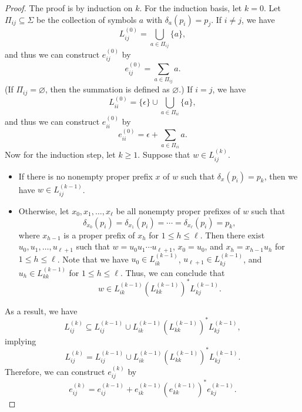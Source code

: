 \begin{proof}
  The proof is by induction on $k$. For the induction basis, let $k = 0$.
  Let $\Pi_{ij} \subseteq \Sigma$ be the collection of symbols $a$ with
  $\delta_a(p_i) = p_j$.
  If $i \neq j$, we have
  \begin{equation*}
    L_{ij}^{(0)} = \bigcup_{a \in \Pi_{ij}} \{a\},
  \end{equation*}
  and thus we can construct $e_{ij}^{(0)}$ by
  \begin{equation*}
    e_{ij}^{(0)} = \sum_{a \in \Pi_{ij}} a.
  \end{equation*}
  (If $\Pi_{ij} = \varnothing$, then the summation is defined as
  $\varnothing$.)
  If $i = j$, we have
  \begin{equation*}
    L_{ii}^{(0)} = \{\epsilon\} \cup \bigcup_{a \in \Pi_{ii}} \{a\},
  \end{equation*}
  and thus we can construct $e_{ii}^{(0)}$ by
  \begin{equation*}
    e_{ii}^{(0)} = \epsilon + \sum_{a \in \Pi_{ii}} a.
  \end{equation*}
  Now for the induction step, let $k \geq 1$.
  Suppose that $w \in L_{ij}^{(k)}$.
  \begin{itemize}
    \item If there is no nonempty proper prefix $x$ of $w$ such that
    $\delta_x(p_i) = p_k$, then we have $w \in L_{ij}^{(k-1)}$.
    \item Otherwise, let $x_0, x_1, \dots, x_\ell$ be all nonempty
    proper prefixes of $w$ such that
    \begin{equation*}
      \delta_{x_0}(p_i)
      = \delta_{x_1}(p_i)
      = \cdots
      = \delta_{x_\ell}(p_i)
      = p_k,
    \end{equation*}
    where $x_{h-1}$ is a proper prefix of $x_h$ for $1 \leq h \leq \ell$.
    Then there exist $u_0, u_1, \dots, u_{\ell+1}$ such that
    $w = u_0u_1 \cdots u_{\ell+1}$, $x_0 = u_0$, and $x_h = x_{h-1}u_h$
    for $1 \leq h \leq \ell$.
    Note that we have $u_0 \in L_{ik}^{(k-1)}$,
    $u_{\ell+1} \in L_{kj}^{(k-1)}$, and
    $u_h \in L_{kk}^{(k-1)}$ for $1 \leq h \leq \ell$.
    Thus, we can conclude that
    \begin{equation*}
      w \in L_{ik}^{(k-1)}\left(L_{kk}^{(k-1)}\right)^*L_{kj}^{(k-1)}.
    \end{equation*}
  \end{itemize}
  As a result, we have
  \begin{equation*}
    L_{ij}^{(k)} \subseteq L_{ij}^{(k-1)} \cup
    L_{ik}^{(k-1)}\left(L_{kk}^{(k-1)}\right)^*L_{kj}^{(k-1)},
  \end{equation*}
  implying
  \begin{equation*}
    L_{ij}^{(k)} = L_{ij}^{(k-1)} \cup
    L_{ik}^{(k-1)}\left(L_{kk}^{(k-1)}\right)^*L_{kj}^{(k-1)}.
  \end{equation*}
  Therefore, we can construct $e_{ij}^{(k)}$ by
  \begin{equation*}
    e_{ij}^{(k)} = e_{ij}^{(k-1)}
    + e_{ik}^{(k-1)}\left(e_{kk}^{(k-1)}\right)^*e_{kj}^{(k-1)}.
  \end{equation*}


\end{proof}
